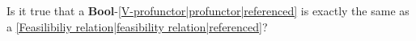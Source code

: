 
Is it true that a \textbf{Bool}-\ref{V-profunctor|profunctor|referenced} is exactly the same as a \ref{Feasilibiliy relation|feasibility relation|referenced}?